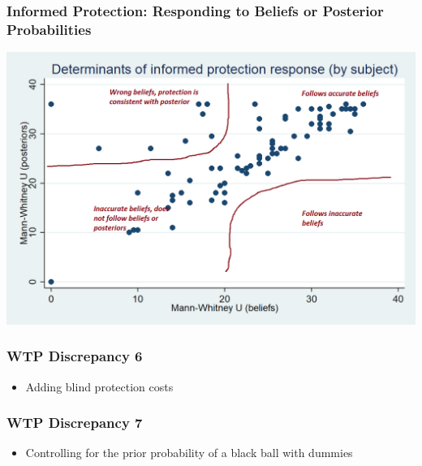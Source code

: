 \documentclass[11pt,hyperref={bookmarks=false}]{beamer}
\begin{document}
\begin{frame}
\frametitle{Informed Protection: Responding to Beliefs or Posterior Probabilities}

\includegraphics[scale=0.45]{Graphs/clustering1.png}
\end{frame}





\begin{frame}
\frametitle{WTP Discrepancy 6}
\begin{itemize}
\item Adding blind protection costs
\end{itemize}
\footnotesize

\normalsize
\end{frame}



\begin{frame}
\frametitle{WTP Discrepancy 7}
\begin{itemize}
\item Controlling for the prior probability of a black ball with dummies
\end{itemize}
\footnotesize

\normalsize
\end{frame}
\end{document}
